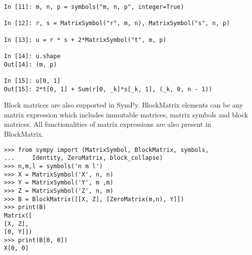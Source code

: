 \begin{verbatim}
In [11]: m, n, p = symbols("m, n, p", integer=True)

In [12]: r, s = MatrixSymbol("r", m, n), MatrixSymbol("s", n, p)

In [13]: u = r * s + 2*MatrixSymbol("t", m, p)

In [14]: u.shape
Out[14]: (m, p)

In [15]: u[0, 1]
Out[15]: 2*t[0, 1] + Sum(r[0, _k]*s[_k, 1], (_k, 0, n - 1))
\end{verbatim}

Block matrices are also supported in SymPy. BlockMatrix elements can be
any matrix expression which includes immutable matrices, matrix symbols and
block matrices. All functionalities of matrix expressions are also present in
BlockMatrix.


\begin{verbatim}
>>> from sympy import (MatrixSymbol, BlockMatrix, symbols,
...     Identity, ZeroMatrix, block_collapse)
>>> n,m,l = symbols('n m l')
>>> X = MatrixSymbol('X', n, n)
>>> Y = MatrixSymbol('Y', m ,m)
>>> Z = MatrixSymbol('Z', n, m)
>>> B = BlockMatrix([[X, Z], [ZeroMatrix(m,n), Y]])
>>> print(B)
Matrix([
[X, Z],
[0, Y]])
>>> print(B[0, 0])
X[0, 0]
\end{verbatim}